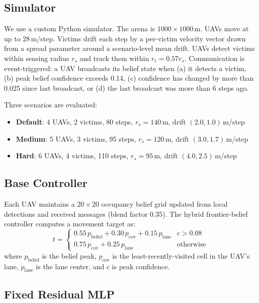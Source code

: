 \documentclass[conference]{IEEEtran}
\begin{document}
\subsection{Simulator}

We use a custom Python simulator. The arena is $1000 \times 1000$\,m. UAVs move at
up to 28\,m/step. Victims drift each step by a per-victim velocity vector drawn from
a spread parameter around a scenario-level mean drift. UAVs detect victims within
sensing radius $r_s$ and track them within $r_t = 0.57 r_s$. Communication is
event-triggered: a UAV broadcasts its belief state when (a) it detects a victim,
(b) peak belief confidence exceeds 0.14, (c) confidence has changed by more than
0.025 since last broadcast, or (d) the last broadcast was more than 6 steps ago.

Three scenarios are evaluated:
\begin{itemize}
  \item \textbf{Default}: 4 UAVs, 2 victims, 80 steps, $r_s = 140$\,m, drift $(2.0, 1.0)$\,m/step
  \item \textbf{Medium}: 5 UAVs, 3 victims, 95 steps, $r_s = 120$\,m, drift $(3.0, 1.7)$\,m/step
  \item \textbf{Hard}: 6 UAVs, 4 victims, 110 steps, $r_s = 95$\,m, drift $(4.0, 2.5)$\,m/step
\end{itemize}

\subsection{Base Controller}

Each UAV maintains a $20 \times 20$ occupancy belief grid updated from local detections
and received messages (blend factor 0.35). The hybrid frontier-belief controller
computes a movement target as:
\[
  t = \begin{cases}
    0.55\, p_{\text{belief}} + 0.30\, p_{\text{cov}} + 0.15\, p_{\text{lane}} & c > 0.08 \\
    0.75\, p_{\text{cov}} + 0.25\, p_{\text{lane}} & \text{otherwise}
  \end{cases}
\]
where $p_{\text{belief}}$ is the belief peak, $p_{\text{cov}}$ is the least-recently-visited
cell in the UAV's lane, $p_{\text{lane}}$ is the lane center, and $c$ is peak confidence.

\subsection{Fixed Residual MLP}
\end{document}
